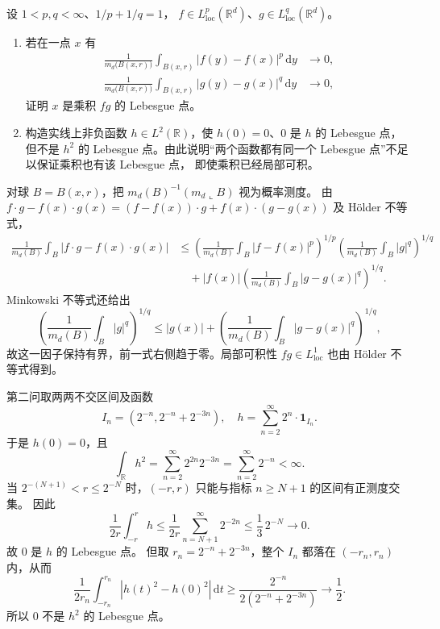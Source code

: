 \begin{exercise}\label{b1:ex:14-products-at-lebesgue-points}
设 \(1<p,q<\infty\)、\(1/p+1/q=1\)，
\(f\in L^p_{\mathrm{loc}}(\mathbb R^d)\)、\(g\in L^q_{\mathrm{loc}}(\mathbb R^d)\)。
\begin{enumerate}
\item\label{b1:item:14-product-holder-point}
若在一点 \(x\) 有
\[
 \begin{aligned}
 \frac1{m_d\bigl(B(x,r)\bigr)}\int_{B(x,r)}|f(y)-f(x)|^p\,\mathrm dy&\longrightarrow0,\\
 \frac1{m_d\bigl(B(x,r)\bigr)}\int_{B(x,r)}|g(y)-g(x)|^q\,\mathrm dy&\longrightarrow0,
 \end{aligned}
\]
证明 \(x\) 是乘积 \(fg\) 的 Lebesgue 点。
\item\label{b1:item:14-product-failure}
构造实线上非负函数 \(h\in L^2(\mathbb R)\)，使 \(h(0)=0\)、\(0\) 是 \(h\) 的 Lebesgue 点，
但不是 \(h^2\) 的 Lebesgue 点。由此说明“两个函数都有同一个 Lebesgue 点”不足以保证乘积也有该 Lebesgue 点，
即使乘积已经局部可积。
\end{enumerate}
\end{exercise}
\begin{solution}
对球 \(B=B(x,r)\)，把 \(m_d(B)^{-1}(m_d\llcorner B)\) 视为概率测度。
由 \(f\cdot g-f(x)\cdot g(x)=(f-f(x))\cdot g+f(x)\cdot(g-g(x))\) 及 Hölder 不等式，
\[
 \begin{aligned}
 \frac1{m_d(B)}\int_B|f\cdot g-f(x)\cdot g(x)|
 &\leq
 \left(\frac1{m_d(B)}\int_B|f-f(x)|^p\right)^{1/p}
 \left(\frac1{m_d(B)}\int_B|g|^q\right)^{1/q}\\
 &\quad+|f(x)|\left(\frac1{m_d(B)}\int_B|g-g(x)|^q\right)^{1/q}.
 \end{aligned}
\]
Minkowski 不等式还给出
\[
 \left(\frac1{m_d(B)}\int_B|g|^q\right)^{1/q}
 \leq|g(x)|+
 \left(\frac1{m_d(B)}\int_B|g-g(x)|^q\right)^{1/q},
\]
故这一因子保持有界，前一式右侧趋于零。局部可积性 \(fg\in L^1_{\mathrm{loc}}\) 也由 Hölder 不等式得到。

第二问取两两不交区间及函数
\[
 I_n=(2^{-n},2^{-n}+2^{-3n}),\quad
 h=\sum_{n=2}^{\infty}2^n\cdot\mathbf1_{I_n}.
\]
于是 \(h(0)=0\)，且
\[
 \int_{\mathbb R}h^2=\sum_{n=2}^{\infty}2^{2n}2^{-3n}
 =\sum_{n=2}^{\infty}2^{-n}<\infty.
\]
当 \(2^{-(N+1)}<r\leq2^{-N}\) 时，\((-r,r)\) 只能与指标 \(n\geq N+1\) 的区间有正测度交集。
因此
\[
 \frac1{2r}\int_{-r}^rh
 \leq\frac1{2r}\sum_{n=N+1}^{\infty}2^{-2n}
 \leq\frac13\,2^{-N}\longrightarrow0.
\]
故 \(0\) 是 \(h\) 的 Lebesgue 点。
但取 \(r_n=2^{-n}+2^{-3n}\)，整个 \(I_n\) 都落在 \((-r_n,r_n)\) 内，从而
\[
 \frac1{2r_n}\int_{-r_n}^{r_n}|h(t)^2-h(0)^2|\,\mathrm dt
 \geq\frac{2^{-n}}{2(2^{-n}+2^{-3n})}
 \longrightarrow\frac12.
\]
所以 \(0\) 不是 \(h^2\) 的 Lebesgue 点。
\end{solution}

